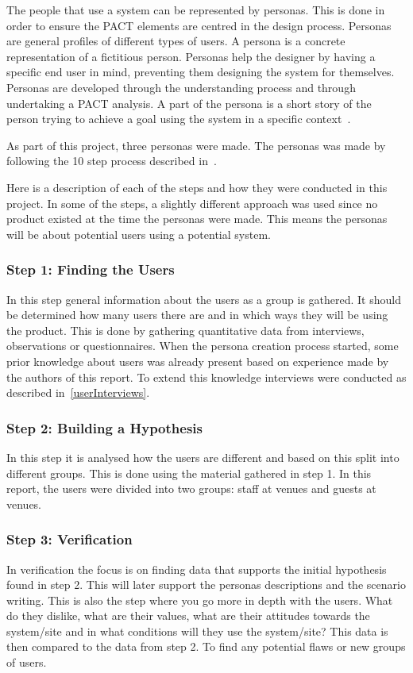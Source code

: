 The people that use a system can be represented by personas. This is done in order to ensure the PACT elements are centred in the design process. Personas are general profiles of different types of users. A persona is a concrete representation of a fictitious person. Personas help the designer by having a specific end user in mind, preventing them designing the system for themselves. Personas are developed through the understanding process and through undertaking a PACT analysis. A part of the persona is a short story of the person trying to achieve a goal using the system in a specific context~\cite{benyon2013designing}.

As part of this project, three personas were made. The personas was made by following the 10 step process described in~\cite{lene2007persona}.

Here is a description of each of the steps and how they were conducted in this project. In some of the steps, a slightly different approach was used since no product existed at the time the personas were made. This means the personas will be about potential users using a potential system.

\subsubsection{Step 1: Finding the Users}
In this step general information about the users as a group is gathered. It should be determined how many users there are and in which ways they will be using the product. This is done by gathering quantitative data from interviews, observations or questionnaires. When the persona creation process started, some prior knowledge about users was already present based on experience made by the authors of this report. To extend this knowledge interviews were conducted as described in~\cref{userInterviews}.

\subsubsection{Step 2: Building a Hypothesis}
In this step it is analysed how the users are different and based on this split into different groups. This is done using the material gathered in step 1. In this report, the users were divided into two groups: staff at venues and guests at venues.

\subsubsection{Step 3: Verification}
In verification the focus is on finding data that supports the initial hypothesis found in step 2. This will later support the personas descriptions and the scenario writing. This is also the step where you go more in depth with the users. What do they dislike, what are their values, what are their attitudes towards the system/site and in what conditions will they use the system/site? This data is then compared to the data from step 2. To find any potential flaws or new groups of users.

